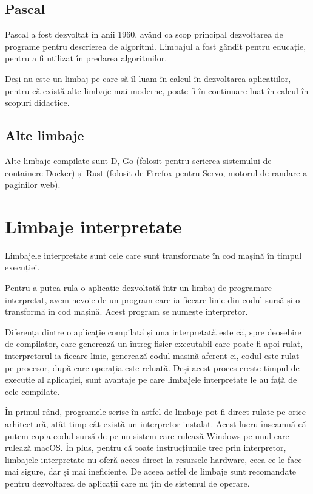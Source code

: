 \subsection{Pascal}
\label{sec:appdev:compiled-lang:pascal}

Pascal a fost dezvoltat în anii 1960, având ca scop principal dezvoltarea de programe pentru descrierea de algoritmi.
Limbajul a fost gândit pentru educație, pentru a fi utilizat în predarea algoritmilor.

Deși nu este un limbaj pe care să îl luam în calcul în dezvoltarea aplicațiilor, pentru că există alte limbaje mai moderne, poate fi în continuare luat în calcul în scopuri didactice.

\subsection{Alte limbaje}
\label{sec:appdev:compiled-lang:other}

Alte limbaje compilate sunt D, Go (folosit pentru scrierea sistemului de containere Docker) și Rust (folosit de Firefox pentru Servo, motorul de randare a paginilor web).

\section{Limbaje interpretate}
\label{sec:appdev-langs-int}

Limbajele interpretate sunt cele care sunt transformate în cod mașină în timpul execuției.

Pentru a putea rula o aplicație dezvoltată într-un limbaj de programare interpretat, avem nevoie de un program care ia fiecare linie din codul sursă și o transformă în cod mașină.
Acest program se numește interpretor.

Diferența dintre o aplicație compilată și una interpretată este că, spre deosebire de compilator, care generează un întreg fișier executabil care poate fi apoi rulat, interpretorul ia fiecare linie, generează codul mașină aferent ei, codul este rulat pe procesor, după care operația este reluată.
Deși acest proces crește timpul de execuție al aplicației, sunt avantaje pe care limbajele interpretate le au față de cele compilate.

În primul rând, programele scrise în astfel de limbaje pot fi direct rulate pe orice arhitectură, atât timp cât există un interpretor instalat.
Acest lucru înseamnă că putem copia codul sursă de pe un sistem care rulează Windows pe unul care rulează macOS.
În plus, pentru că toate instrucțiunile trec prin interpretor, limbajele interpretate nu oferă acces direct la resursele hardware, ceea ce le face mai sigure, dar și mai ineficiente.
De aceea astfel de limbaje sunt recomandate pentru dezvoltarea de aplicații care nu țin de sistemul de operare.

